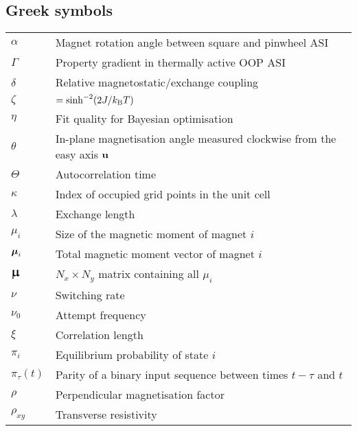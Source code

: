 \subsection*{Greek symbols}
\begin{longtable}[l]{p{60pt} p{350pt}}
	$\alpha$ & Magnet rotation angle between square and pinwheel ASI \\[\whiteline]
	
	$\Gamma$ & Property gradient in thermally active OOP ASI \\[\whiteline]

	$\delta$ & Relative magnetostatic/exchange coupling \\[\whiteline]
	
	$\zeta$ & $=\sinh^{-2}(2J/\kBT)$ \\[\whiteline]
	
	$\eta$ & Fit quality for Bayesian optimisation \\[\whiteline]

	$\theta$ & In-plane magnetisation angle measured clockwise from the easy axis $\boldsymbol{\mathbf{u}}$ \\
	$\Theta$ & Autocorrelation time \\[\whiteline]
	
	$\kappa$ & Index of occupied grid points in the unit cell \\[\whiteline]
	
	$\lambda$ & Exchange length \\[\whiteline]

	$\mu_i$ & Size of the magnetic moment of magnet $i$ \\
	$\boldsymbol{\mathbf{\mu}}_i$ & Total magnetic moment vector of magnet $i$ \\
	$\vc{\bigmu}$ & $N_x \times N_y$ matrix containing all $\mu_i$ \\[\whiteline]
	
	$\nu$ & Switching rate \\
	$\nu_0$ & Attempt frequency \\[\whiteline]
	
	$\xi$ & Correlation length \\[\whiteline]

	$\pi_i$ & Equilibrium probability of state $i$ \\
	$\pi_\tau(t)$ & Parity of a binary input sequence between times $t-\tau$ and $t$ \\[\whiteline]

	$\rho$ & Perpendicular magnetisation factor \\
	$\rho_{xy}$ & Transverse resistivity \\[\whiteline]
	

\end{longtable}
